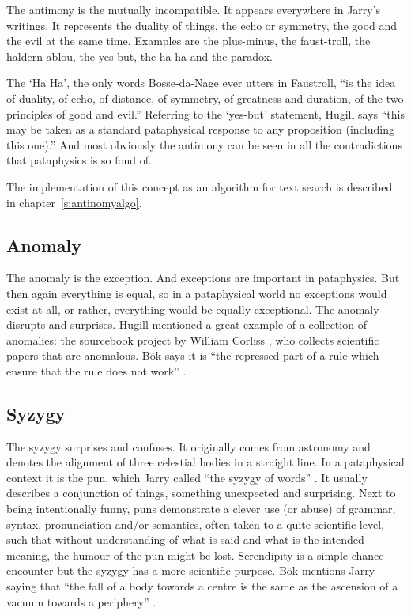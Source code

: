 The antimony is the mutually incompatible. It appears everywhere in Jarry's writings. It represents the duality of things, the echo or symmetry, the good and the evil at the same time. Examples are the plus-minus, the faust-troll, the haldern-ablou, the yes-but, the ha-ha and the paradox.

The `Ha Ha', the only words Bosse-da-Nage ever utters in Faustroll, ``is the idea of duality, of echo, of distance, of symmetry, of greatness and duration, of the two principles of good and evil.'' \autocite{Hugill2012} Referring to the `yes-but' statement, Hugill says ``this may be taken as a standard pataphysical response to any proposition (including this one).'' And most obviously the antimony can be seen in all the contradictions that pataphysics is so fond of.

The implementation of this concept as an algorithm for text search is described in chapter~\ref{s:antinomyalgo}.


\subsection{Anomaly}
\label{s:anomaly}

The anomaly is the exception. And exceptions are important in pataphysics. But then again everything is equal, so in a pataphysical world no exceptions would exist at all, or rather, everything would be equally exceptional. The anomaly disrupts and surprises. Hugill mentioned a great example of a collection of anomalies: the sourcebook project by William Corliss \autocite*{Corlissnd}, who collects scientific papers that are anomalous. Bök says it is ``the repressed part of a rule which ensure that the rule does not work'' \autocite*{Bok2002}.


\subsection{Syzygy}
\label{s:syzygy}

The syzygy surprises and confuses. It originally comes from astronomy and denotes the alignment of three celestial bodies in a straight line. In a pataphysical context it is the pun, which Jarry called ``the syzygy of words'' \autocite*{Jarry1996}. It usually describes a conjunction of things, something unexpected and surprising. Next to being intentionally funny, puns demonstrate a clever use (or abuse) of grammar, syntax, pronunciation and/or semantics, often taken to a quite scientific level, such that without understanding of what is said and what is the intended meaning, the humour of the pun might be lost. Serendipity is a simple chance encounter but the syzygy has a more scientific purpose. Bök mentions Jarry saying that ``the fall of a body towards a centre is the same as the ascension of a vacuum towards a periphery'' \autocite*{Bok2002}.

